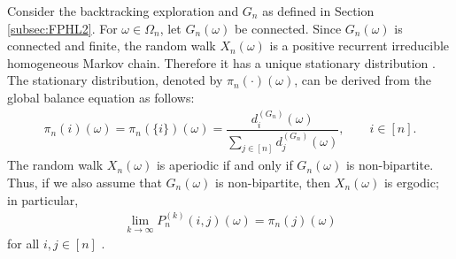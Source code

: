 \documentclass[11pt]{article}
\numberwithin{equation}{section}
\theoremstyle{plain}
\newcommand{\dn}{d^{(G_{n})}}
\begin{document}
Consider the backtracking exploration and $G_{n}$ as defined in Section \ref{subsec:FPHL2}. For $\omega\in \Omega_{n}$, let $G_{n}(\omega)$ be connected. Since $G_{n}(\omega)$ is connected and finite, the random walk $X_{n}(\omega)$ is a positive recurrent irreducible homogeneous Markov chain. Therefore it has a unique stationary distribution \cite[Theorem 3.2.6]{B}. The stationary distribution, denoted by $\pi_{n}(\cdot)(\omega)$, can be derived from the global balance equation as follows:
\begin{align}\label{statform}
\pi_{n}(i)(\omega) = \pi_{n}(\{i\})(\omega)=\dfrac{\dn_{i}(\omega)}{\sum_{j\in [n]}\dn_{j}(\omega)}, \qquad i\in [n].
\end{align}
The random walk $X_{n}(\omega)$ is aperiodic if and only if $G_{n}(\omega)$ is non-bipartite. Thus, if we also assume that $G_{n}(\omega)$ is non-bipartite, then $X_{n}(\omega)$ is ergodic; in particular,
\begin{align}
\label{statlim}
\lim_{k\rightarrow\infty}P_{n}^{(k)}(i,j)(\omega)=\pi_{n}(j)(\omega)
\end{align}
for all $i,j\in[n]$ \cite[Theorem 1.8.3]{N}. 
\end{document}
